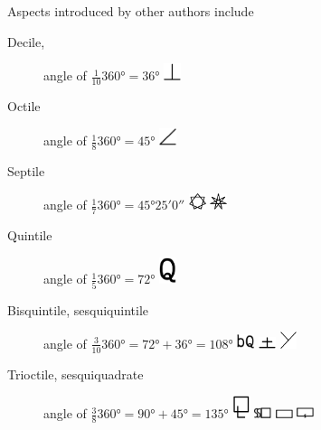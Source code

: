 \documentclass[british,final,landscape]{scrartcl}
\begin{document}
\begin{refsection}
Aspects introduced by other authors include
\begin{description}
   \item[Decile, ]{angle of \(\frac{1}{10} \ang{360} = \ang{36}\) \includegraphics[width=5mm]{Astrology/Decile}}
   \item[Octile]{angle of \(\frac{1}{8} \ang{360} = \ang{45}\) \includegraphics[width=5mm]{Astrology/Octile}}
   \item[Septile]{angle of \(\frac{1}{7} \ang{360} = \ang{45;25;0}\) \includegraphics[width=5mm]{Astrology/Septile} \includegraphics[width=5mm]{Astrology/Septile2}}
   \item[Quintile]{angle of \(\frac{1}{5} \ang{360} = \ang{72}\) \includegraphics[width=5mm]{Astrology/Quintile}}
   \item[Bisquintile, sesquiquintile]{angle of \(\frac{3}{10} \ang{360} = \ang{72} + \ang{36} = \ang{108}\) \includegraphics[width=5mm]{Astrology/Bisquintile} \includegraphics[width=5mm]{Astrology/Bisquintile2} \includegraphics[width=5mm]{Astrology/Bisquintile3}}
   \item[Trioctile, sesquiquadrate]{angle of \(\frac{3}{8} \ang{360} = \ang{90} + \ang{45} = \ang{135}\) \includegraphics[width=5mm]{Astrology/Trioctile} \includegraphics[width=5mm]{Astrology/Trioctile2} \includegraphics[width=5mm]{Astrology/Trioctile3} \includegraphics[width=5mm]{Astrology/Trioctile4} }

\end{description}
\end{refsection}
\end{document}
